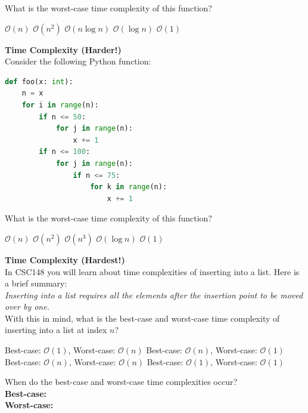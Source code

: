 \documentclass[letterpaper,13pt,addpoints]{exam}
\begin{document}
\begin{questions}
    What is the worst-case time complexity of this function?
    \begin{choices}
        \choice $\mathcal{O}(n)$
        \choice $\mathcal{O}(n^2)$
        \choice $\mathcal{O}(n\log n)$
        \choice $\mathcal{O}(\log n)$
        \choice $\mathcal{O}(1)$
    \end{choices}
    \pagebreak
    \question[5] \textbf{Time Complexity (Harder!)} \\
    Consider the following Python function:
    \begin{lstlisting}[language=Python, style=mystyle]
def foo(x: int):
    n = x
    for i in range(n):
        if n <= 50:
            for j in range(n):
                x += 1
        if n <= 100:
            for j in range(n):
                if n <= 75:
                    for k in range(n):
                        x += 1
    \end{lstlisting}
    What is the worst-case time complexity of this function?
    \begin{choices}
        \choice $\mathcal{O}(n)$
        \choice $\mathcal{O}(n^2)$
        \choice $\mathcal{O}(n^3)$
        \choice $\mathcal{O}(\log n)$
        \choice $\mathcal{O}(1)$
    \end{choices}
    \question[5] \textbf{Time Complexity (Hardest!)} \\
    In CSC148 you will learn about time complexities of inserting into a list. Here is a brief summary: \\
    \textit{Inserting into a list requires all the elements after the insertion point to be moved over by one.} \\
    With this in mind, what is the best-case and worst-case time complexity of inserting into a list at index $n$?
    \begin{choices}
        \choice Best-case: $\mathcal{O}(1)$, Worst-case: $\mathcal{O}(n)$
        \choice Best-case: $\mathcal{O}(n)$, Worst-case: $\mathcal{O}(1)$
        \choice Best-case: $\mathcal{O}(n)$, Worst-case: $\mathcal{O}(n)$
        \choice Best-case: $\mathcal{O}(1)$, Worst-case: $\mathcal{O}(1)$
    \end{choices}
    When do the best-case and worst-case time complexities occur? \\
    \textbf{Best-case:} \underline{\hspace{15cm}} \\
    \bigskip
    \textbf{Worst-case:} \underline{\hspace{15cm}} \\


\end{questions}
\end{document}
